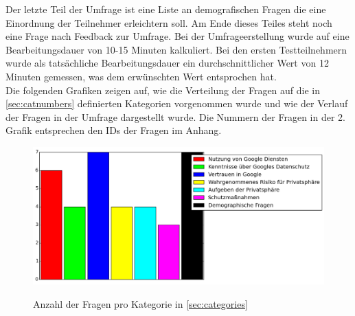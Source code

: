 Der letzte Teil der Umfrage ist eine Liste an demografischen Fragen die eine Einordnung der Teilnehmer erleichtern soll. Am Ende dieses Teiles steht noch eine Frage nach Feedback zur Umfrage.
Bei der Umfrageerstellung wurde auf eine Bearbeitungsdauer von 10-15 Minuten kalkuliert. Bei den ersten Testteilnehmern wurde als tatsächliche Bearbeitungsdauer ein durchschnittlicher Wert von 12 Minuten gemessen, was dem erwünschten Wert entsprochen hat.\\
Die folgenden Grafiken zeigen auf, wie die Verteilung der Fragen auf die in \ref{sec:catnumbers} definierten Kategorien vorgenommen wurde und wie der Verlauf der Fragen in der Umfrage dargestellt wurde. Die Nummern der Fragen in der 2. Grafik entsprechen den IDs der Fragen im Anhang. 

\begin{figure}[H]
\centering
\includegraphics[width=\textwidth]{images/zahlenkategorien}\\
\caption{Anzahl der Fragen pro Kategorie in \ref{sec:categories}}\label{catnumbers}
\end{figure}

